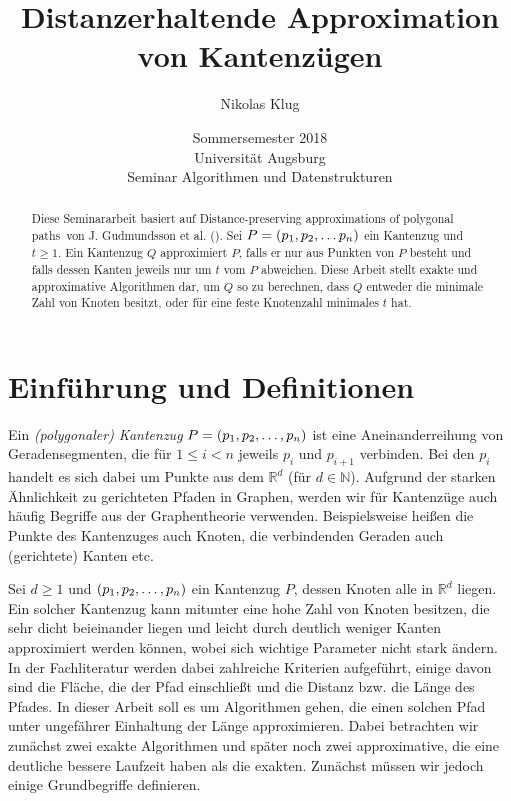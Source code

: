 \documentclass[11pt]{article}
\title{Distanzerhaltende Approximation von Kantenzügen}
\author{Nikolas Klug}
\date{Sommersemester 2018
	\\ Universität Augsburg
	\\ Seminar Algorithmen und Datenstrukturen}
\newcommand{\R}{\mathbb{R}}
\begin{document}
    \maketitle

    \begin{abstract}
        Diese Seminararbeit basiert auf \glqq Distance-preserving approximations of polygonal paths\grqq\ von J. Gudmundsson et al. (\cite{gudmundsson}). Sei $P = (p_1, p_2, \mathellipsis p_n)$ ein Kantenzug und $t \geq 1$. Ein Kantenzug $Q$ approximiert $P$, falls er nur aus Punkten von $P$ besteht und falls dessen Kanten jeweils nur um $t$ vom $P$ abweichen. Diese Arbeit stellt exakte und approximative Algorithmen dar, um $Q$ so zu berechnen, dass $Q$ entweder die minimale Zahl von Knoten besitzt, oder für eine feste Knotenzahl 
        minimales $t$ hat.
    \end{abstract}

    \section{Einführung und Definitionen}
    \label{sec:intro}

	Ein \emph{(polygonaler) Kantenzug} $P = (p_1, p_2, \mathellipsis, p_n)$ ist eine Aneinanderreihung von Geradensegmenten, die für $1 \leq i < n$ jeweils $p_i$ und $p_{i+1}$ verbinden. Bei den $p_i$ handelt es sich dabei um Punkte aus dem $\R^d$ (für $d \in \mathbb{N}$). Aufgrund der starken Ähnlichkeit zu gerichteten Pfaden in Graphen, werden wir für Kantenzüge auch häufig Begriffe aus der Graphentheorie verwenden. Beispielsweise heißen die Punkte des Kantenzuges  auch Knoten, die verbindenden Geraden auch (gerichtete) Kanten etc.

    Sei $d\geq1$ und $(p_1, p_2, \mathellipsis, p_n)$ ein Kantenzug $P$, dessen Knoten alle in $\R^{d}$ liegen.
    Ein solcher Kantenzug kann mitunter eine hohe Zahl von Knoten besitzen, die sehr dicht beieinander liegen und leicht durch deutlich weniger Kanten approximiert werden können, wobei sich wichtige Parameter nicht stark ändern. In der Fachliteratur werden dabei zahlreiche Kriterien aufgeführt, einige davon sind die Fläche, die der Pfad einschließt und die Distanz bzw. die Länge des Pfades. In dieser Arbeit soll es um Algorithmen gehen, die einen solchen Pfad unter ungefährer Einhaltung der Länge approximieren. Dabei betrachten wir zunächst zwei exakte Algorithmen und später noch zwei approximative, die eine deutliche bessere Laufzeit haben als die exakten. Zunächst müssen wir jedoch einige Grundbegriffe definieren.
   
\end{document}
